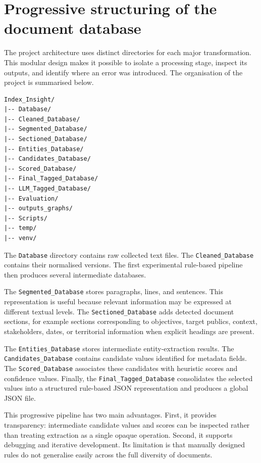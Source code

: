 \documentclass[
11pt,
english,
singlespacing,
headsepline,
]{MastersDoctoralThesis}
\begin{document}
\section{Progressive structuring of the document database}

The project architecture uses distinct directories for each major transformation.
This modular design makes it possible to isolate a processing stage, inspect its
outputs, and identify where an error was introduced. The organisation of the
project is summarised below.

\begin{verbatim}
Index_Insight/
|-- Database/
|-- Cleaned_Database/
|-- Segmented_Database/
|-- Sectioned_Database/
|-- Entities_Database/
|-- Candidates_Database/
|-- Scored_Database/
|-- Final_Tagged_Database/
|-- LLM_Tagged_Database/
|-- Evaluation/
|-- outputs_graphs/
|-- Scripts/
|-- temp/
|-- venv/
\end{verbatim}

The \texttt{Database} directory contains raw collected text files. The
\texttt{Cleaned\_Database} contains their normalised versions. The first
experimental rule-based pipeline then produces several intermediate databases.

The \texttt{Segmented\_Database} stores paragraphs, lines, and sentences. This
representation is useful because relevant information may be expressed at
different textual levels. The \texttt{Sectioned\_Database} adds detected
document sections, for example sections corresponding to objectives, target
publics, context, stakeholders, dates, or territorial information when explicit
headings are present.

The \texttt{Entities\_Database} stores intermediate entity-extraction results.
The \texttt{Candidates\_Database} contains candidate values identified for
metadata fields. The \texttt{Scored\_Database} associates these candidates with
heuristic scores and confidence values. Finally, the
\texttt{Final\_Tagged\_Database} consolidates the selected values into a
structured rule-based JSON representation and produces a global JSON file.

This progressive pipeline has two main advantages. First, it provides
transparency: intermediate candidate values and scores can be inspected rather
than treating extraction as a single opaque operation. Second, it supports
debugging and iterative development. Its limitation is that manually designed
rules do not generalise easily across the full diversity of documents.
\end{document}
